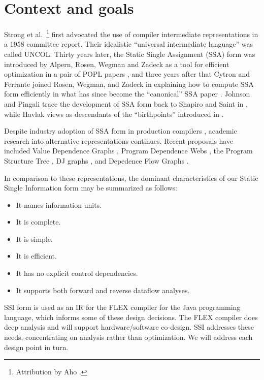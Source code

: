 \documentclass[12pt,titlepage,twoside]{article}
\let\oldsection\section
\renewcommand{\section}{\setcounter{figure}{0}\setcounter{table}{0}\oldsection}
\begin{document}
\section{Context and goals}
Strong et al.\ \cite{strong58}\footnote{Attribution by 
Aho \cite{aho88:dragon}.} first advocated the use of compiler
intermediate representations in a 1958 committee report.  Their
idealistic ``universal intermediate language'' was called UNCOL.
Thirty years later, the Static Single Assignment (SSA) form was
introduced by  Alpern, Rosen, Wegman and Zadeck
as a tool for efficient optimization in a pair of POPL
papers \cite{alpern88:ssa,rosen88:gvn}, and three years after that Cytron
and Ferrante joined Rosen, Wegman, and Zadeck in explaining how to
compute SSA form efficiently in what has since become the 
``canonical'' SSA paper \cite{cytron89:ssa}.  Johnson and Pingali
\cite{johnson93:dfg} trace the development of SSA form back to Shapiro
and Saint in \cite{shapiro70:ssa}, while Havlak \cite{havlak94:isa}
views  as descendants of the ``birthpoints'' introduced
in \cite{reif81:sym}.

Despite industry adoption of SSA form in production compilers
\cite{chow97:ssapre,chow96:hssa}, academic research into alternative
representations continues.
Recent proposals have included Value Dependence Graphs
\cite{weise94:vdg}, Program Dependence Webs \cite{ballance90:pdw},
the Program Structure Tree \cite{johnson94:pst},
DJ graphs \cite{sreedhar96:dj}, and Depedence Flow Graphs
\cite{johnson93:dfg}.

In comparison to these representations, the dominant characteristics of
our Static Single Information form may be summarized as follows:
\begin{itemize}
\item It names information units.
\item It is complete.
\item It is simple.
\item It is efficient.
\item It has no explicit control dependencies.
\item It supports both forward and reverse dataflow analyses.
\end{itemize}
SSI form is used as an IR for the FLEX compiler for the Java
programming language, which informs some of these design decisions.
The FLEX compiler does deep analysis and will support
hardware/software co-design.  SSI addresses these needs, concentrating
on analysis rather than optimization.  We will address each design
point in turn.
\end{document}
